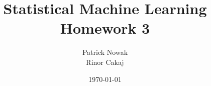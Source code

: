 \documentclass[
	colorback=false,
	solution=true,
	]{tudaexercise}
\def\homework{3}
\begin{document}
\title{Statistical Machine Learning Homework 3}
\author{Patrick Nowak\\Rinor Cakaj}
\date{\today}
\sheetnumber{\homework}
\setcounter{section}{\homework}

\maketitle

\newpage

\newpage



%
\end{document}
